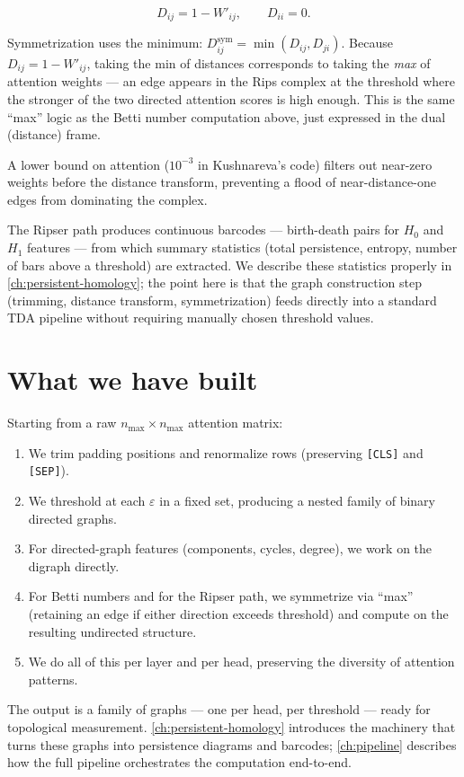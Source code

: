 \[
  D_{ij} = 1 - W'_{ij}, \qquad D_{ii} = 0.
\]

Symmetrization uses the minimum: $D^{\text{sym}}_{ij} = \min(D_{ij}, D_{ji})$.
Because $D_{ij} = 1 - W'_{ij}$, taking the min of distances corresponds to
taking the \emph{max} of attention weights --- an edge appears in the Rips
complex at the threshold where the stronger of the two directed attention
scores is high enough.  This is the same ``max'' logic as the Betti number
computation above, just expressed in the dual (distance) frame.

A lower bound on attention ($10^{-3}$ in Kushnareva's code) filters out
near-zero weights before the distance transform, preventing a flood of
near-distance-one edges from dominating the complex.

The Ripser path produces continuous barcodes --- birth-death pairs for $H_0$
and $H_1$ features --- from which summary statistics (total persistence,
entropy, number of bars above a threshold) are extracted.  We describe these
statistics properly in \autoref{ch:persistent-homology}; the point here is that
the graph construction step (trimming, distance transform, symmetrization)
feeds directly into a standard TDA pipeline without requiring manually chosen
threshold values.

\section{What we have built}

Starting from a raw $n_{\max} \times n_{\max}$ attention matrix:

\begin{enumerate}
  \item We trim padding positions and renormalize rows (preserving \texttt{[CLS]} and \texttt{[SEP]}).
  \item We threshold at each $\varepsilon$ in a fixed set, producing a nested family of binary directed graphs.
  \item For directed-graph features (components, cycles, degree), we work on the digraph directly.
  \item For Betti numbers and for the Ripser path, we symmetrize via ``max'' (retaining an edge if either direction exceeds threshold) and compute on the resulting undirected structure.
  \item We do all of this per layer and per head, preserving the diversity of attention patterns.
\end{enumerate}

The output is a family of graphs --- one per head, per threshold --- ready for
topological measurement.  \autoref{ch:persistent-homology} introduces the
machinery that turns these graphs into persistence diagrams and barcodes;
\autoref{ch:pipeline} describes how the full pipeline orchestrates the
computation end-to-end.
